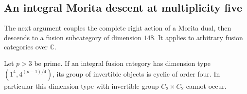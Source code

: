 \subsection{An integral Morita descent at multiplicity five}
\label{sec:m5-4982-morita-descent}

The next argument couples the complete right action of a Morita dual,
then descends to a fusion subcategory of dimension $148$. It applies to
arbitrary fusion categories over $\mathbb C$.

\begin{lemma}\label{lem:four-p-cyclic-invertibles}
Let $p>3$ be prime. If an integral fusion category has dimension type
$(1^4,4^{(p-1)/4})$, its group of invertible objects is cyclic of order
four. In particular this dimension type with invertible group
$C_2\times C_2$ cannot occur.
\end{lemma}
